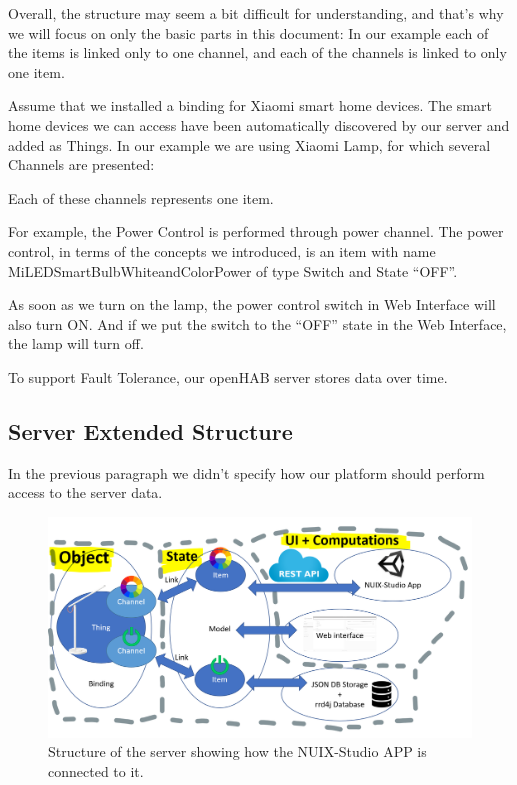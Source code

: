Overall, the structure may seem a bit difficult for understanding, and that’s why we will focus on only the basic parts in this document:
In our example each of the items is linked only to one channel, and each of the channels is linked to only one item. 

Assume that we installed a binding for Xiaomi smart home devices. The smart home devices we can access have been automatically discovered by our server and added as Things. In our example we are using Xiaomi Lamp, for which several Channels are presented:

Each of these channels represents one item. 

For example, the Power Control is performed through power channel. The power control, in terms of the concepts we introduced, is an item with name MiLEDSmartBulbWhiteandColorPower of type Switch and State “OFF”.

As soon as we turn on the lamp, the power control switch in Web Interface will also turn ON. And if we put the switch to the “OFF” state in the Web Interface, the lamp will turn off.

To support Fault Tolerance, our openHAB server stores data over time.

\subsection{Server Extended Structure}

In the previous paragraph we didn’t specify how our platform should perform access to the server data. 

\begin{figure}
  \centering
  \includegraphics[width=0.9\linewidth]{figures/ExtendedServerStructure.png}
  \caption{Structure of the server showing how the NUIX-Studio APP is connected to it.}
  \label{fig:ExtendedServerStructure-figure}
\end{figure}

